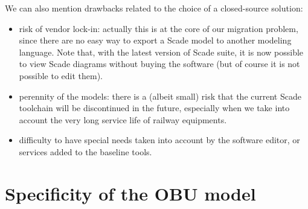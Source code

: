 \documentclass{template/openetcs_report}
\begin{document}
We can also mention drawbacks related to the choice of a closed-source
solution:
\begin{itemize}
\item risk of vendor lock-in: actually this is at the core of our
  migration problem, since there are no easy way to export a Scade
  model to another modeling language. Note that, with the latest
  version of Scade suite, it is now possible to view Scade diagrams
  without buying the software (but of course it is not possible to
  edit them).

\item perennity of the models: there is a (albeit small) risk that the
  current Scade toolchain will be discontinued in the future,
  especially when we take into account the very long service life of
  railway equipments.

\item difficulty to have special needs taken into account by the
  software editor, or services added to the baseline tools.
\end{itemize}



\section{Specificity of the OBU model}
\end{document}
